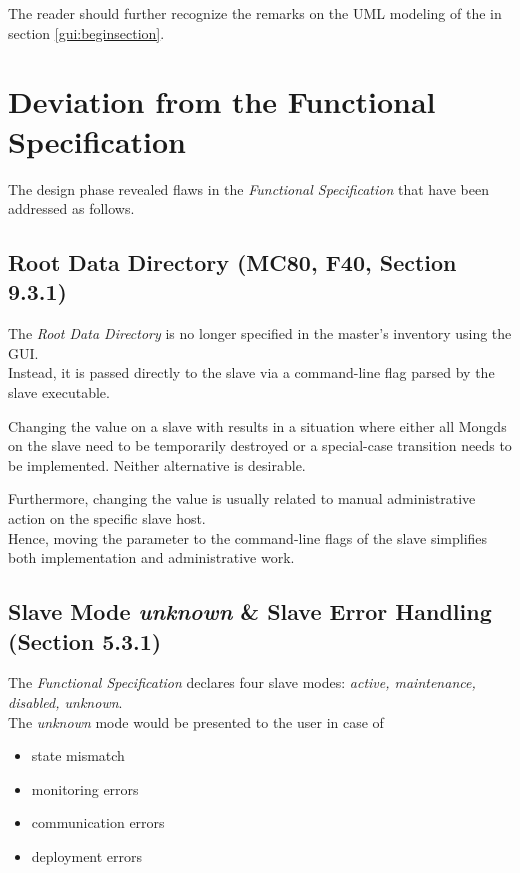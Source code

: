 The reader should further recognize the remarks on the UML modeling of the  in section \ref{gui:beginsection}.

\section{Deviation from the Functional Specification}

The design phase revealed flaws in the \emph{Functional Specification} that have been addressed as follows.

\subsection{Root Data Directory (MC80, F40, Section 9.3.1)}

The \emph{Root Data Directory} is no longer specified in the master's inventory using the GUI.\\
Instead, it is passed directly to the slave via a command-line flag parsed by the slave executable.

Changing the value on a slave with   results in a situation where either
all Mongds on the slave need to be temporarily destroyed or a special-case transition needs to be implemented.
Neither alternative is desirable.

Furthermore, changing the value is usually related to manual administrative action on the specific slave host.\\
Hence, moving the parameter to the command-line flags of the slave simplifies both implementation and administrative work.

\subsection{Slave Mode \emph{unknown} \& Slave Error Handling (Section 5.3.1)}

The \emph{Functional Specification} declares four slave modes: \emph{active, maintenance, disabled, unknown}.\\
The \emph{unknown} mode would be presented to the user in case of
\begin{itemize}
  \item state mismatch
  \item monitoring errors
  \item communication errors
  \item deployment errors
\end{itemize}

